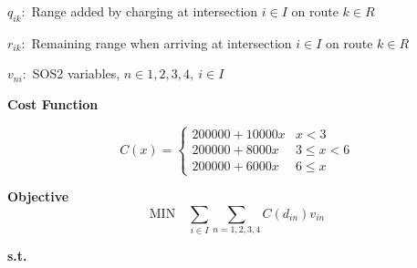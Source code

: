 \documentclass[12pt, fleqn]{article}
\begin{document}
$q_{ik}:$ Range added by charging at intersection $i \in I$ on route $k \in R$

$r_{ik}:$ Remaining range when arriving at intersection $i \in I$ on route $k \in R$

$v_{ni}:$ SOS2 variables, $n \in {1,2,3,4},\ i \in I$

\medskip
\textbf{Cost Function}
\smallskip

\begin{equation}
    C(x) = \begin{cases}
        200000 + 10000 x & x < 3        \\
        200000 + 8000 x  & 3 \leq x < 6 \\
        200000 + 6000 x  & 6 \leq x
    \end{cases}
\end{equation}

\textbf{Objective}
\begin{equation}
    \text{MIN} \quad \sum\limits_{i \in I}{\sum\limits_{n = 1,2,3,4}{C(d_{in}) v_{in}}}
\end{equation}

\textbf{s.t.}
\end{document}
